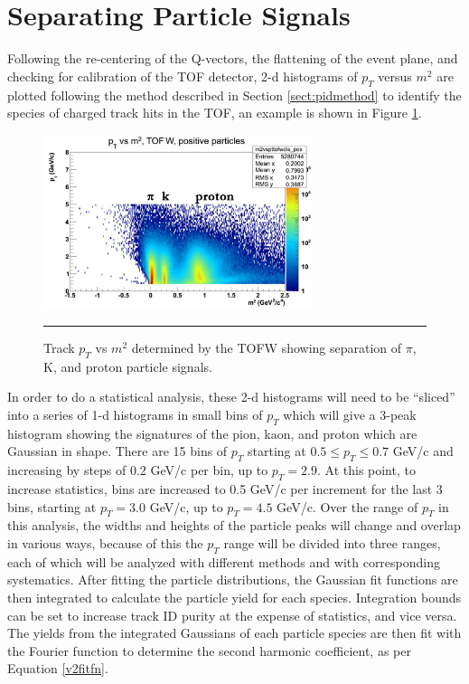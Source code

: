 \section{Separating Particle Signals}
Following the re-centering of the Q-vectors, the flattening of the event plane, and checking for calibration of the TOF detector, 2-d histograms of $p_T$ versus $m^2$ are plotted following the method described in Section \ref{sect:pidmethod} to identify the species of charged track hits in the TOF, an example is shown in Figure \ref{fig:h2m2tof}. 
\begin{figure}[h]
  \centering
    \includegraphics[width=0.7\textwidth]{Figures/ptvsm2tof.jpg}
    \rule{35em}{0.5pt}
  \caption[Track $p_T$ vs $m^2$ determined by the TOFW showing separation of $\pi$, k, and proton particle signals.]{Track $p_T$ vs $m^2$ determined by the TOFW showing separation of $\pi$, K, and proton particle signals.}
  \label{fig:h2m2tof}
\end{figure}

In order to do a statistical analysis, these 2-d histograms will need to be ``sliced'' into a series of 1-d histograms in small bins of $p_T$ which will give a 3-peak histogram showing the signatures of the pion, kaon, and proton which are Gaussian in shape. There are 15 bins of $p_T$ starting at $0.5 \leq p_T \leq 0.7$ GeV/c and increasing by steps of 0.2 GeV/c per bin, up to $p_T = 2.9$. At this point, to increase statistics, bins are increased to 0.5 GeV/c per increment for the last 3 bins, starting at $p_T = 3.0$ GeV/c, up to $p_T = 4.5 $ GeV/c. Over the range of $p_T$ in this analysis, the widths and heights of the particle peaks will change and overlap in various ways, because of this the $p_T$ range will be divided into three ranges, each of which will be analyzed with different methods and with corresponding systematics. After fitting the particle distributions, the Gaussian fit functions are then integrated to calculate the particle yield for each species. Integration bounds can be set to increase track ID purity at the expense of statistics, and vice versa. The yields from the integrated Gaussians of each particle species are then fit with the Fourier function to determine the second harmonic coefficient, as per Equation \ref{v2fitfn}. 

